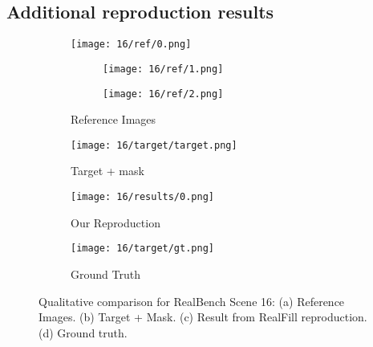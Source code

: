 \documentclass{article}
\begin{document}
\subsection{Additional reproduction results}
\label{appendix:additional_reproduction}
\begin{figure}[H]
    \centering
    \begin{subfigure}[b]{0.24\linewidth}
        \texttt{[image: 16/ref/0.png]}
        \begin{subfigure}[b]{0.49\linewidth}
            \texttt{[image: 16/ref/1.png]}
        \end{subfigure}
        \begin{subfigure}[b]{0.49\linewidth}
            \texttt{[image: 16/ref/2.png]}
        \end{subfigure}
        \caption{Reference Images}
    \end{subfigure}
    \hfill
    \centering
    \begin{subfigure}[b]{0.24\linewidth}
        \texttt{[image: 16/target/target.png]}
        \caption{Target + mask}
    \end{subfigure}
    \hfill
    \centering
    \begin{subfigure}[b]{0.24\linewidth}
        \texttt{[image: 16/results/0.png]}
        \caption{Our Reproduction}
    \end{subfigure}
    \begin{subfigure}[b]{0.24\linewidth}
        \texttt{[image: 16/target/gt.png]}
        \caption{Ground Truth}
    \end{subfigure}
    \caption{Qualitative comparison for RealBench Scene 16: (a) Reference Images. (b) Target + Mask. (c) Result from RealFill reproduction. (d) Ground truth.}
    \label{fig:additional_reproduction_16}
\end{figure}
\end{document}

